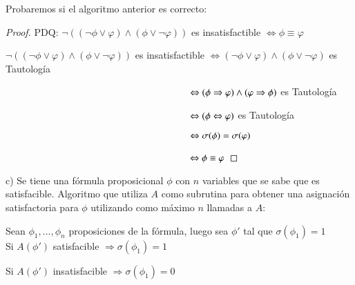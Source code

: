 \documentclass[
	spanish, %
	letterpaper, oneside
]{article}
\begin{document}
Probaremos si el algoritmo anterior es correcto:

\begin{proof}
    PDQ: $\neg ((\neg \phi \vee \varphi)\land(\phi \vee \neg \varphi))$ es insatisfactible $\Leftrightarrow \phi \equiv \varphi$

    $\neg ((\neg \phi \vee \varphi)\land(\phi \vee \neg \varphi))$ es insatisfactible $\Leftrightarrow (\neg \phi \vee \varphi)\land(\phi \vee \neg \varphi)$ es Tautología

    $\hspace{67mm} \Leftrightarrow (\phi \Rightarrow \varphi) \land (\varphi \Rightarrow \phi)$ es Tautología

    $\hspace{67mm} \Leftrightarrow (\phi \Leftrightarrow \varphi)$ es Tautología

    $\hspace{67mm} \Leftrightarrow \sigma(\phi) = \sigma(\varphi)$

    $\hspace{67mm} \Leftrightarrow \phi \equiv \varphi$
    
\end{proof}

\newpage

c) Se tiene una fórmula proposicional $\phi$ con $n$ variables que se sabe que es satisfacible. Algoritmo que utiliza $A$ como subrutina para obtener una asignación satisfactoria para $\phi$ utilizando como máximo $n$ llamadas a $A$:

Sean $\phi_1,...,\phi_n$ proposiciones de la fórmula, luego sea $\phi '$ tal que $\sigma(\phi_1)=1$\\

Si $A(\phi')$ satisfacible $\Rightarrow \sigma(\phi_1)=1$

Si $A(\phi')$ insatisfacible $\Rightarrow \sigma(\phi_1)=0$\\
\end{document}
